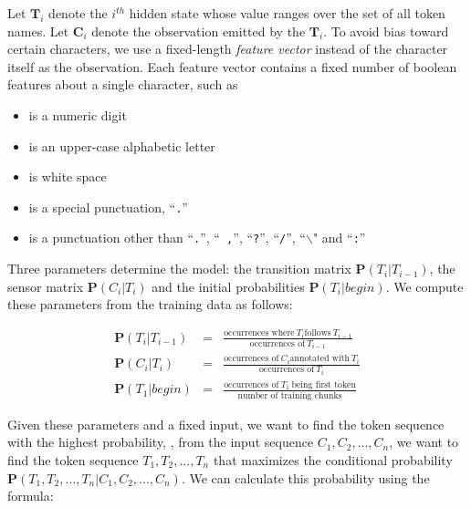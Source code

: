  
Let $\mathbf{T}_i$ denote the $i^{th}$ hidden state whose value ranges over
the set of all token names.
Let $\mathbf{C}_i$ denote the observation emitted by the $\mathbf{T}_i$.
To avoid bias toward certain characters, we use
a fixed-length \textit{feature vector} instead of the character itself
as the observation. Each feature vector contains a
fixed number of boolean features about a single character, such as
\begin{itemize}
\item is a numeric digit
\item is an upper-case alphabetic letter
\item is white space
\item is a special punctuation, ``{\tt .}''
\item is a punctuation other than ``{\tt .}'', ``{\tt
,}'', ``{\tt ?}'', ``{\tt /}'', ``{\tt $\backslash$}" and ``{\tt :}''
\end{itemize}
Three parameters determine the model:
the transition matrix $\mathbf{P}(T_i|T_{i-1})$,
the sensor matrix $\mathbf{P}(C_i|T_i)$ and the initial
probabilities $\mathbf{P}(T_i|begin)$. 
We compute these parameters from the training data as follows:

\begin{eqnarray}
\mathbf{P}(T_i|T_{i-1}) & = & \frac{\textrm{occurrences where}~ T_i\textrm{
follows}~ T_{i-1}}{\textrm{occurrences of}~ T_{i-1}} \label{eqn:1}\\
\mathbf{P}(C_i|T_i) & = & \frac{\textrm{occurrences of}~ C_i \textrm{
annotated with}~ T_i}{\textrm{occurrences of}~ T_i} \\
\mathbf{P}(T_1|begin) & = & \frac{\textrm{occurrences of}~ T_1~ \textrm{being first token}}
{\textrm{number of training chunks}} \label{eqn:2}
\end{eqnarray}

Given these parameters and a fixed input, we want to find the token
sequence with the highest probability, \ie{}, from the input sequence 
$C_1, C_2, ..., C_n$, we want to find the token sequence 
$T_1, T_2, ..., T_n$ 
that maximizes the conditional probability
$\mathbf{P}(T_1, T_2, ..., T_n|C_1, C_2, ..., C_n)$.
We can calculate this probability using the formula:

